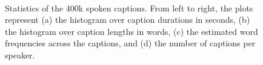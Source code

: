 \begin{figure}
\centering
{}
 \\
\caption[Statistics of the 400k spoken captions]{Statistics of the 400k spoken captions. From left to right, the plots represent (a) the histogram over caption durations in seconds, (b) the histogram over caption lengths in words, (c) the estimated word frequencies across the captions, and (d) the number of captions per speaker.}
\label{fig:data_stats}
\end{figure}

